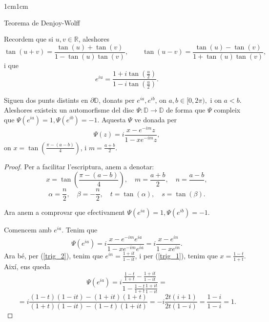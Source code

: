 \begin{adjustwidth}{1cm}{1cm}
\begin{subsection}{Teorema de Denjoy-Wolff}


    \begin{nota}
        Recordem que si $u,v\in \mathbb{R}$, aleshores
        \begin{equation}
            \tan(u+v)=\frac{\tan(u)+\tan(v)}{1-\tan(u)\tan(v)}, \qquad \tan(u-v)=\frac{\tan(u)-\tan(v)}{1+\tan(u)\tan(v)}, 
            \label{trig_1}
        \end{equation}
        i que 
        \begin{equation}
            e^{iu}=\frac{1+i\tan(\frac{u}{2})}{1-i\tan(\frac{u}{2})}.
            \label{trig_2}
        \end{equation}
    \end{nota}

    \begin{lema}
        Siguen dos punts distints en $\partial \mathbb{D}$, donats per $e^{ia},e^{ib}$, on $a,b\in[0,2\pi),$ i on $a<b$. Aleshores existeix un automorfisme del disc $\Psi:\mathbb{D}\to \mathbb{D}$ de forma que $\Psi$ compleix que $\Psi(e^{ia})=1, \Psi(e^{ib})=-1$. Aquesta $\Psi$ ve donada per
        \[
            \Psi(z)=i \frac{x-e^{-im}z}{1-xe^{-im}z},
        \]
        on $x=\tan(\frac{\pi-(a-b)}{4})$, i $m=\frac{a+b}{2}$.
        \label{lema_ajuda_hiperbolica}
    \end{lema}

    \begin{proof}
        Per a facilitar l'escriptura, anem a denotar:
        \[
            x=\tan(\frac{\pi-(a-b)}{4}), \quad m=\frac{a+b}{2}, \quad n=\frac{a-b}{},
        \]
        \[
            \alpha=\frac{n}{2}, \quad \beta=-\frac{n}{2}, \quad t=\tan(\alpha), \quad s=\tan(\beta).
        \]

        Ara anem a comprovar que efectivament $\Psi(e^{ia})=1, \Psi(e^{ib})=-1$.

        Comencem amb $e^{ia}$. Tenim que 
        \[
            \Psi(e^{ia})=i \frac{x-e^{-im}e^{ia}}{1-xe^{-im}e^{ia}}=i \frac{x-e^{in}}{1-xe^{in}}.
        \]
        Ara bé, per (\ref{trig_2}), tenim que $e^{in}=\frac{1+it}{1-it}$, i per (\ref{trig_1}), tenim que $x=\frac{1-t}{1+t}$. Així, ens queda
        \[
            \Psi(e^{ia})=i \frac{\frac{1-t}{1+t}-\frac{1+it}{1-it}}{1-\frac{1-t}{1+t}\frac{1+it}{1-it}}=
        \]
        \[
            =i \frac{(1-t)(1-it)-(1+it)(1+t)}{(1+t)(1-it)-(1-t)(1+it)}=-i\frac{2t(i+1)}{2t(1-i)}=\frac{1-i}{1-i}=1.
        \]


\end{proof}
\end{subsection}
\end{adjustwidth}

